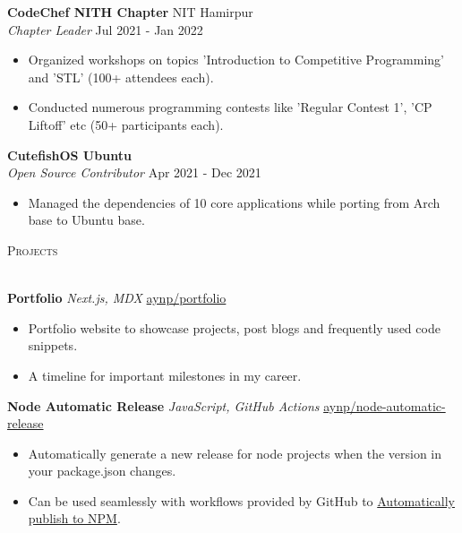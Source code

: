 \documentclass[a4paper]{article}
\newcommand{\lineunder} {
    \vspace*{-8pt} \\
    \hspace*{-18pt} \hrulefill \\
}
\newcommand{\header} [1] {
    {\hspace*{-18pt}\vspace*{6pt} \textsc{#1}}
    \vspace*{-6pt} \lineunder
}
\begin{document}
\textbf{CodeChef NITH Chapter} \hfill NIT Hamirpur\\
\textit{Chapter Leader} \hfill Jul 2021 - Jan 2022\\
\begin{itemize}
	\item Organized workshops on topics 'Introduction to Competitive Programming' and 'STL' (100+ attendees each).
	\item Conducted numerous programming contests like 'Regular Contest 1', 'CP Liftoff' etc (50+ participants each).
\end{itemize}
\vspace{1.5mm}

\textbf{CutefishOS Ubuntu}\\
\textit{Open Source Contributor} \hfill Apr 2021 - Dec 2021\\
\begin{itemize}
	\item Managed the dependencies of 10 core applications while porting from Arch base to Ubuntu base.
\end{itemize}
\vspace{1.5mm}


\header{Projects}
\vspace{1mm}

{\textbf{Portfolio}} {\sl Next.js, MDX} \hfill \href{https://github.com/aynp/portfolio}{aynp/portfolio}\\
\begin{itemize}
	\item Portfolio website to showcase projects, post blogs and frequently used code snippets.
	\item A timeline for important milestones in my career.
\end{itemize}
\vspace*{1.5mm}

{\textbf{Node Automatic Release}} {\sl JavaScript, GitHub Actions} \hfill \href{https://github.com/aynp/node-automatic-release}{aynp/node-automatic-release}\\
\begin{itemize}
	\item Automatically generate a new release for node projects when the version in your package.json changes.
	\item Can be used seamlessly with workflows provided by GitHub to \href{https://aryanpathania.vercel.app/blog/automatic-npm-publish}{Automatically publish to NPM}.
\end{itemize}
\vspace*{1.5mm}
\end{document}
